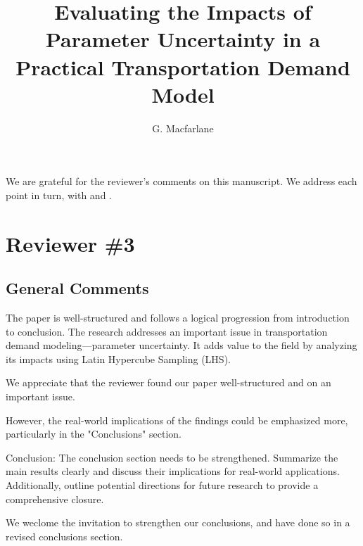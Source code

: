 \documentclass{ar2rc}
\title{Evaluating the Impacts of Parameter Uncertainty in a Practical Transportation Demand Model}
\author{G. Macfarlane}
\begin{document}
\maketitle

We are grateful for the reviewer's comments on this manuscript. We address each point in turn, with 
\DIFaddbegin {}\DIFaddend  and 
\DIFdelbegin {}\DIFdelend.

\section{Reviewer \#3}

\subsection{General Comments}
\RC The paper is well-structured and follows a logical progression from introduction to conclusion. The
research addresses an important issue in transportation demand modeling—parameter uncertainty. It
adds value to the field by analyzing its impacts using Latin Hypercube Sampling (LHS). 

\AR We appreciate that the reviewer found our paper well-structured and on an important issue.

\RC However, the real-world implications of the findings could be emphasized
more, particularly in the "Conclusions" section.

 Conclusion: The conclusion section needs to be strengthened. Summarize the main results
clearly and discuss their implications for real-world applications. Additionally, outline potential
directions for future research to provide a comprehensive closure.

\AR We weclome the invitation to strengthen our conclusions, and have done so in a revised conclusions section.
\end{document}

